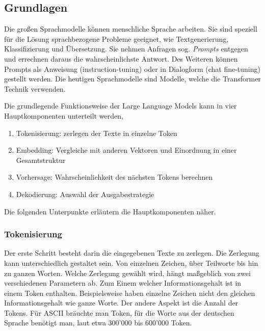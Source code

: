 \subsection{Grundlagen}

Die großen Sprachmodelle können menschliche Sprache arbeiten. Sie sind speziell für die Lösung  sprachbezogene Probleme geeignet, wie Textgenerierung, Klassifizierung und Übersetzung. Sie nehmen Anfragen sog. \textit{Prompts} entgegen und errechnen daraus die wahrscheinlichste Antwort. Des Weiteren können Prompts als Anweisung (instruction-tuning) oder in Dialogform (chat fine-tuning) gestellt werden. Die heutigen Sprachmodelle sind Modelle, welche die Transformer Technik verwenden.

Die grundlegende Funktionsweise der Large Language Models kann in vier Hauptkomponenten unterteilt werden,

\begin{enumerate}
	\item Tokenisierung: zerlegen der Texte in einzelne Token
	\item Embedding: Vergleiche mit anderen Vektoren und Einordnung in einer Gesamtstruktur
	\item Vorhersage: Wahrscheinlichkeit des nächsten Tokens berechnen
	\item Dekodierung: Auswahl der Ausgabestrategie
\end{enumerate}

Die folgenden Unterpunkte erläutern die Hauptkomponenten näher.

\subsubsection{Tokenisierung}
Der erste Schritt besteht darin die eingegebenen Texte zu zerlegen. Die Zerlegung kann unterschiedlich gestaltet sein. Von einzelnen Zeichen, über Teilworte bis hin zu ganzen Worten. Welche Zerlegung gewählt wird, hängt maßgeblich von zwei verschiedenen Parametern ab. Zum Einem welcher Informationsgehalt ist in einem Token enthalten. Beispielsweise haben einzelne Zeichen nicht den gleichen Informationsgehalt wie ganze Worte. Der andere Aspekt ist die Anzahl der Tokens. Für ASCII bräuchte man  Token, für die Worte aus der deutschen Sprache benötigt man, laut \cite{duden_unknown-author} etwa 300'000 bis 600'000 Token.\vspace{0.2cm}


